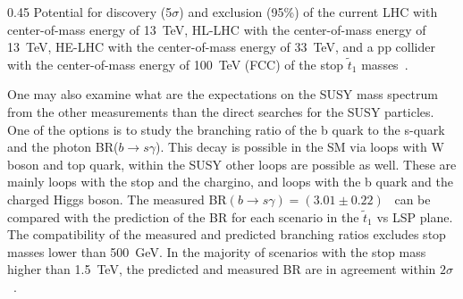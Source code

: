                  {0.45}       %
                 { Potential for discovery (5$\sigma$) and exclusion (95\%) of the current LHC with center-of-mass energy of 13~TeV, HL-LHC with the center-of-mass energy of 13~TeV, HE-LHC with the center-of-mass energy of 33~TeV,  and a pp collider with the center-of-mass energy of 100~TeV (FCC) of the stop $\tilde{t}_{1}$ masses~\cite{Baer:2016bwh}.  }


One may also examine what are the expectations on the SUSY mass spectrum from the other measurements than the direct searches for the SUSY particles. One of the options is to study the branching ratio of the b quark to the s-quark and the photon BR($b \to s\gamma$).  This decay is possible in the SM via loops with W boson and top quark, within the SUSY other loops are possible as well. These are mainly loops with the  stop and the chargino, and loops with the b quark and the charged Higgs boson. The measured BR$(b \to s\gamma) = (3.01 \pm 0.22)$~\cite{Belle:2016ufb} can be compared with the prediction of the BR for each scenario in the $\tilde{t}_{1}$ vs LSP plane. The compatibility of the measured and predicted branching ratios excludes stop masses lower than 500~GeV. In the majority of scenarios with the stop mass higher than 1.5~TeV, the predicted and measured BR are in agreement within $2\sigma$~\cite{Baer:2016bwh}.

